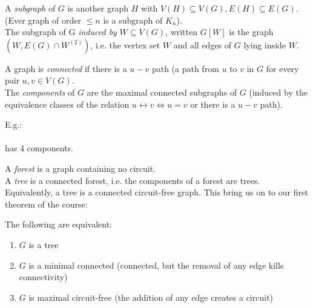 \documentclass[10pt,a4paper]{article}
\begin{document}
A \emph{subgraph} of $G$ is another graph $H$ with $V(H) \subseteq V(G), E(H) \subseteq E(G)$. (Ever graph of order $\leq n$ is a subgraph of $K_n$).\\
The subgraph of G \emph{induced by} $W \subseteq V(G)$, written $G[W]$ is the graph $(W, E(G)\cap W^{(2)})$, i.e. the vertex set $W$ and all edges of $G$ lying inside $W$.

A graph is \emph{connected} if there is a $u-v$ path (a path from $u$ to $v$ in $G$ for every pair $u,v \in V(G)$.\\
The \emph{components} of $G$ are the maximal connected subgraphs of $G$ (induced by the equivalence classes of the relation $u\leftrightarrow v \iff u = v$ or there is a $u-v$ path).

E.g.:\\
\\
has 4 components.

A \emph{forest} is a graph containing no circuit.\\
A \emph{tree} is a connected forest, i.e. the components of a forest are trees.\\
Equivalently, a tree is a connected circuit-free graph. This bring us on to our first theorem of the course:

\begin{theorem}
The following are equivalent:
\begin{enumerate}
\item $G$ is a tree
\item $G$ is a minimal connected (connected, but the removal of any edge kills connectivity)
\item $G$ is maximal circuit-free (the addition of any edge creates a circuit)
\end{enumerate}
\end{theorem}
\end{document}
